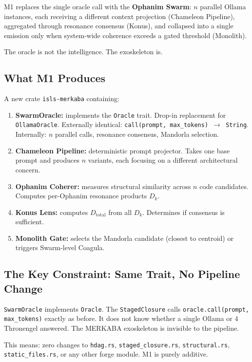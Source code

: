 \documentclass[11pt,a4paper]{article}
\begin{document}
M1 replaces the single oracle call with the \textbf{Ophanim Swarm}: 
$n$ parallel Ollama instances, each receiving a different context 
projection (Chameleon Pipeline), aggregated through resonance 
consensus (Konus), and collapsed into a single emission only when 
system-wide coherence exceeds a gated threshold (Monolith).

The oracle is not the intelligence. The exoskeleton is.

\subsection{What M1 Produces}

A new crate \texttt{isls-merkaba} containing:

\begin{enumerate}[nosep]
\item \textbf{SwarmOracle:} implements the \texttt{Oracle} trait.
      Drop-in replacement for \texttt{OllamaOracle}. 
      Externally identical: \texttt{call(prompt, max\_tokens) 
      $\to$ String}. Internally: $n$ parallel calls, resonance 
      consensus, Mandorla selection.
\item \textbf{Chameleon Pipeline:} deterministic prompt projector.
      Takes one base prompt and produces $n$ variants, each 
      focusing on a different architectural concern.
\item \textbf{Ophanim Coherer:} measures structural similarity 
      across $n$ code candidates. Computes per-Ophanim resonance 
      products $D_k$.
\item \textbf{Konus Lens:} computes $D_\text{total}$ from all 
      $D_k$. Determines if consensus is sufficient.
\item \textbf{Monolith Gate:} selects the Mandorla candidate 
      (closest to centroid) or triggers Swarm-level Coagula.
\end{enumerate}

\subsection{The Key Constraint: Same Trait, No Pipeline Change}

\texttt{SwarmOracle} implements \texttt{Oracle}. The 
\texttt{StagedClosure} calls \texttt{oracle.call(prompt, 
max\_tokens)} exactly as before. It does not know whether a 
single Ollama or 4 Thronengel answered. The MERKABA exoskeleton 
is invisible to the pipeline.

This means: zero changes to \texttt{hdag.rs}, 
\texttt{staged\_closure.rs}, \texttt{structural.rs}, 
\texttt{static\_files.rs}, or any other forge module. M1 is 
purely additive.
\end{document}
